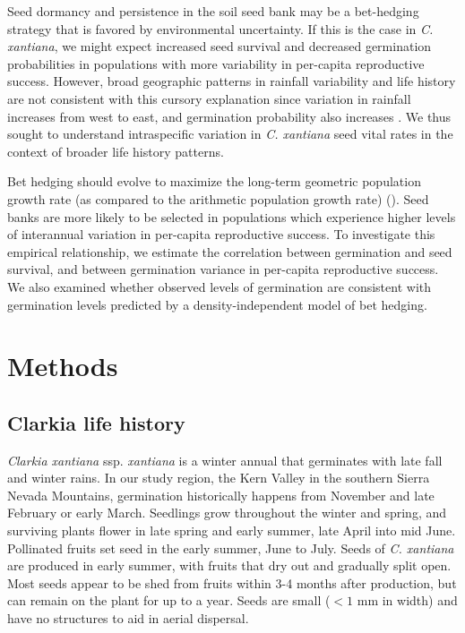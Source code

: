 \documentclass[12pt, oneside, titlepage]{article}   	%
\begin{document}
{Seed dormancy and persistence in the soil seed bank may be a bet-hedging strategy that is favored by environmental uncertainty. If this is the case in \textit{C. xantiana}, we might expect increased seed survival and decreased germination probabilities in populations with more variability in per-capita reproductive success. However, broad geographic patterns in rainfall variability and life history are not consistent with this cursory explanation since variation in rainfall increases from west to east, and germination probability also increases \cite{eckhart2011}. We thus sought to understand intraspecific variation in \textit{C. xantiana} seed vital rates in the context of broader life history patterns. 

Bet hedging should evolve to maximize the long-term geometric population growth rate (as compared to the arithmetic population growth rate) (\cite{cohen1966,cohen1968,ellner1985,ellner1985a}). Seed banks are more likely to be selected in populations which experience higher levels of interannual variation in per-capita reproductive success. To investigate this empirical relationship, we estimate the correlation between germination and seed survival, and between germination variance in per-capita reproductive success. We also examined whether observed levels of germination are consistent with germination levels predicted by a density-independent model of bet hedging. 
\fi




\section{Methods}

\subsection{Clarkia life history}

\textit{Clarkia xantiana} ssp. \textit{xantiana} is a winter annual that germinates with late fall and winter rains. In our study region, the Kern Valley in the southern Sierra Nevada Mountains, germination historically happens from November and late February or early March. Seedlings grow throughout the winter and spring, and surviving plants flower in late spring and early summer, late April into mid June. Pollinated fruits set seed in the early summer, June to July. Seeds of \textit{C. xantiana} are produced in early summer, with fruits that dry out and gradually split open. Most seeds appear to be shed from fruits within 3-4 months after production, but can remain on the plant for up to a year. Seeds are small ($<1$ mm in width) and have no structures to aid in aerial dispersal. 

}
\end{document}
